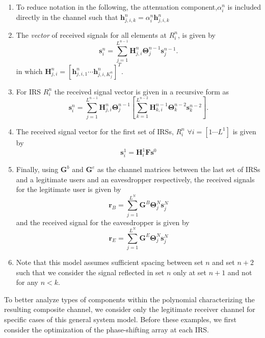 \documentclass[12pt,a4paper]{report}
\begin{document}
\begin{enumerate}
\item
	To reduce notation in the following, the attenuation component,$\alpha_i^n$ is included directly in the channel such that $ \mathbf{h}^{n}_{j,i,k} = \alpha_i^n \mathbf{h}^{n}_{j,i,k}$
\item
The \emph{vector} of received signals for all elements at $R^n_{i}$, is given by
\begin{equation}\label{received_vector}
\mathbf{s}^{n}_{i} = \sum_{j = 1}^{L^{n-1}} \mathbf{H}^{n}_{j,i}\boldsymbol{\Theta}^{n-1}_{j}\mathbf{s}^{n-1}_{j}.
\end{equation}
in which $\mathbf{H}^{n}_{j,i} = [\mathbf{h}^{n}_{j,i,1} \cdots \mathbf{h}^{n}_{j,i,K_{j}^{n}}]^T$.



\item For IRS $R^n_{i}$ the received signal vector is given in a recursive form as
\begin{equation}\label{general_received}
\mathbf{s}^{n}_{i} = \sum_{j = 1}^{L^{n-1}}  \mathbf{H}^{n}_{j,i}\boldsymbol{\Theta}^{n-1}_{j} \left[
\sum_{k = 1}^{L^{n-2}}  \mathbf{H}^{n-1}_{k,i}\boldsymbol{\Theta}^{n-2}_{k}\mathbf{s}^{n-2}_{k} \right].
\end{equation}

\item 
The received signal vector for the first set of IRSs, $R^n_{i}$ $\forall i = [1 \cdots L^{1}]$ is given by 
\begin{equation}
\mathbf{s}^{1}_{i} = \mathbf{H}^{1}_{i}\mathbf{F}\mathbf{s}^0
\end{equation}
\item 
	Finally, using $\mathbf{G}^b$ and $\mathbf{G}^e$ as the channel matrices between the last set of IRSs and a legitimate users and an eavesdropper respectively, the received signals for the legitimate user is given by 
	\begin{equation}\label{legit_received}
\mathbf{r}_{B} = \sum_{j = 1}^{L^{N}}\mathbf{G}^{B}\boldsymbol{\Theta}^{N}_{j}\mathbf{s}^{N}_{j}
\end{equation}
	and the received signal for the eavesdropper is given by 
	\begin{equation}\label{tap_received}
\mathbf{r}_{E} = \sum_{j = 1}^{L^{N}} \mathbf{G}^{E}\boldsymbol{\Theta}^{N}_{j}\mathbf{s}^{N}_{j}
\end{equation}
\item
	Note that this model assumes sufficient spacing between set $n$ and set $n+2$ such that we consider the signal reflected in set $n$ only at set $n+1$ and not for any $n<k$.

\end{enumerate}
To better analyze types of components within the polynomial characterizing the resulting composite channel, we consider only the legitimate receiver channel for specific cases of this general system model. Before these examples, we first consider the optimization of the phase-shifting array at each IRS.
\end{document}
